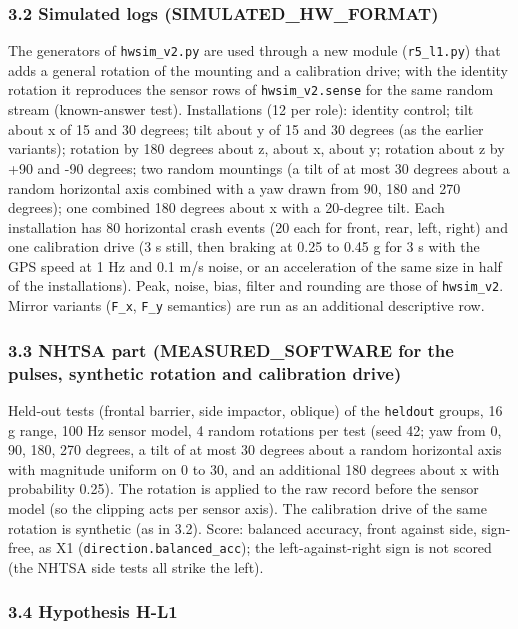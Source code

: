 \subsubsection*{3.2 Simulated logs (SIMULATED\_HW\_FORMAT)}

The generators of \texttt{hwsim\_v2.py} are used through a new module (\texttt{r5\_l1.py}) that adds a general rotation of the mounting and a calibration drive; with the identity rotation it reproduces the sensor rows of \texttt{hwsim\_v2.sense} for the same random stream (known-answer test). Installations (12 per role): identity control; tilt about x of 15 and 30 degrees; tilt about y of 15 and 30 degrees (as the earlier variants); rotation by 180 degrees about z, about x, about y; rotation about z by +90 and -90 degrees; two random mountings (a tilt of at most 30 degrees about a random horizontal axis combined with a yaw drawn from 90, 180 and 270 degrees); one combined 180 degrees about x with a 20-degree tilt. Each installation has 80 horizontal crash events (20 each for front, rear, left, right) and one calibration drive (3 s still, then braking at 0.25 to 0.45 g for 3 s with the GPS speed at 1 Hz and 0.1 m/s noise, or an acceleration of the same size in half of the installations). Peak, noise, bias, filter and rounding are those of \texttt{hwsim\_v2}. Mirror variants (\texttt{F\_x}, \texttt{F\_y} semantics) are run as an additional descriptive row.

\subsubsection*{3.3 NHTSA part (MEASURED\_SOFTWARE for the pulses, synthetic rotation and calibration drive)}

Held-out tests (frontal barrier, side impactor, oblique) of the \texttt{heldout} groups, 16 g range, 100 Hz sensor model, 4 random rotations per test (seed 42; yaw from 0, 90, 180, 270 degrees, a tilt of at most 30 degrees about a random horizontal axis with magnitude uniform on 0 to 30, and an additional 180 degrees about x with probability 0.25). The rotation is applied to the raw record before the sensor model (so the clipping acts per sensor axis). The calibration drive of the same rotation is synthetic (as in 3.2). Score: balanced accuracy, front against side, sign-free, as X1 (\texttt{direction.balanced\_acc}); the left-against-right sign is not scored (the NHTSA side tests all strike the left).

\subsubsection*{3.4 Hypothesis H-L1}

